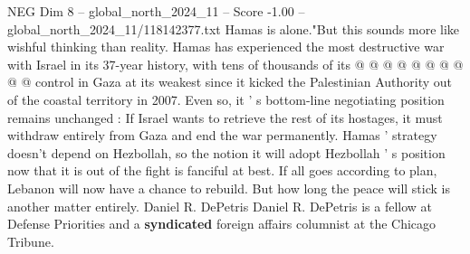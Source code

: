 \begin{textsample}{NEG Dim 8 – global\_north\_2024\_11 – Score -1.00 – global\_north\_2024\_11/118142377.txt}
Hamas is alone."But this sounds more like wishful thinking than reality.
Hamas has experienced the most destructive war with Israel in its 37-year history, with tens of thousands of its @ @ @ @ @ @ @ @ @ @ control in Gaza at its weakest since it kicked the Palestinian Authority out of the coastal territory in 2007.
Even so, it ' s bottom-line negotiating position remains unchanged : If Israel wants to retrieve the rest of its hostages, it must withdraw entirely from Gaza and end the war permanently.
Hamas ' strategy doesn't depend on Hezbollah, so the notion it will adopt Hezbollah ' s position now that it is out of the fight is fanciful at best.
If all goes according to plan, Lebanon will now have a chance to rebuild.
But how long the peace will stick is another matter entirely.
Daniel R.
DePetris Daniel R.
DePetris is a fellow at Defense Priorities and a \textbf{syndicated} foreign affairs columnist at the Chicago Tribune.

\end{textsample}
